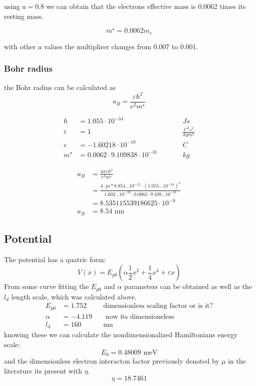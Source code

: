 \documentclass[12pt,a4paper]{article}
\numberwithin{equation}{section}
\begin{document}
 using $a=0.8$ we can obtain that the electrons effective mass is 0.0062 times its resting mass.
 
 \begin{equation}
 m^\star = 0.0062 m_e
 \end{equation}
 
 with other $a$ values the multiplirer changes from 0.007 to 0.001.
 
 \subsubsection{Bohr radius}
 
 the Bohr radius can be calculated as
 \begin{equation}
 a_B = \frac{\varepsilon \hbar^2}{e^2 m^\star}
 \end{equation}

 
 \begin{align}
 \hbar &= 1.055\cdot 10^{-34}  &&Js\\
 \varepsilon &= 1 \qquad &&\frac{C^2 s^2}{kg m^3}\\
 e &= -1.60218 \cdot 10^{-19} \qquad &&C\\
 m^\star &= 0.0062 \cdot 9.109838 \cdot 10^{-31} \qquad &&kg
 \end{align}
 
 \begin{align}
 a_B &= \frac{4 \pi \varepsilon \hbar^2}{e^2 m^\star}\\
 &= \frac{4\cdot pi* 8.854\dots 10^{-12} \cdot \left(1.055\dots 10^{-34}\right)^2}{1.602\dots 10^{-19}\cdot 0.0062\cdot 9.109\dots 10^{-31}}\\
 &= 8.535115539186625\cdot 10^{-9}\\
 a_B &= 8.54 \text{ nm}
  \end{align}

 
\subsection{Potential}
The potential has a quatric form:
\begin{equation}
V(x) = E_{p0} \left(\alpha\frac{1}{2}x^2 + \frac{1}{4}x^4 + \varepsilon x \right)
\end{equation}
From some curve fitting the $E_{p0}$ and $\alpha$ parameters can be obtained as well as the $l_d$ length scale, which was calculated above. 
\begin{align*}
E_{p0} &= 1.752  &&\text{dimensionless scaling factor or is it?} \\
\alpha &= -4.119 &&\text{ now its dimensioneless} \\
l_d &= 160 &&\text{nm}
\end{align*}
knowing these we can calculate the nondimensionalized Hamiltonians energy scale:
\begin{equation}
E_0 = 0.48009 \text{ meV}
\end{equation}
and the dimensionless electron interacton factor previously denoted by $\mu$ in the literature its present with $\eta$.
\begin{equation}
\eta = 18.7461
\end{equation}
\end{document}
